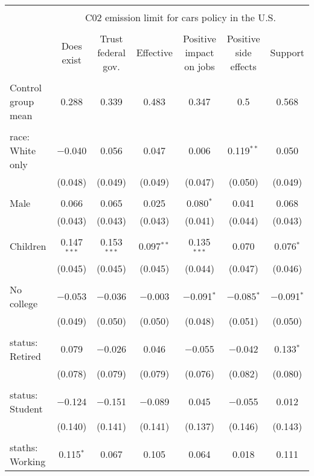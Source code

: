 
\begin{tabular}{@{\extracolsep{5pt}}lcccccc} 
\\[-1.8ex]\hline 
\hline \\[-1.8ex] 
 & \multicolumn{6}{c}{C02 emission limit for cars policy in the U.S.} \\ 
\cline{2-7} 
\\[-1.8ex] & Does exist & Trust federal gov. & Effective & Positive impact on jobs & Positive side effects & Support \\ 
\hline \\[-1.8ex] 
 Control group mean & 0.288 & 0.339 & 0.483 & 0.347 & 0.5 & 0.568  \\ \hline \\[-1.8ex] race: White only & $-$0.040 & 0.056 & 0.047 & 0.006 & 0.119$^{**}$ & 0.050 \\ 
  & (0.048) & (0.049) & (0.049) & (0.047) & (0.050) & (0.049) \\ 
  & & & & & & \\ 
 Male & 0.066 & 0.065 & 0.025 & 0.080$^{*}$ & 0.041 & 0.068 \\ 
  & (0.043) & (0.043) & (0.043) & (0.041) & (0.044) & (0.043) \\ 
  & & & & & & \\ 
 Children & 0.147$^{***}$ & 0.153$^{***}$ & 0.097$^{**}$ & 0.135$^{***}$ & 0.070 & 0.076$^{*}$ \\ 
  & (0.045) & (0.045) & (0.045) & (0.044) & (0.047) & (0.046) \\ 
  & & & & & & \\ 
 No college & $-$0.053 & $-$0.036 & $-$0.003 & $-$0.091$^{*}$ & $-$0.085$^{*}$ & $-$0.091$^{*}$ \\ 
  & (0.049) & (0.050) & (0.050) & (0.048) & (0.051) & (0.050) \\ 
  & & & & & & \\ 
 status: Retired & 0.079 & $-$0.026 & 0.046 & $-$0.055 & $-$0.042 & 0.133$^{*}$ \\ 
  & (0.078) & (0.079) & (0.079) & (0.076) & (0.082) & (0.080) \\ 
  & & & & & & \\ 
 status: Student & $-$0.124 & $-$0.151 & $-$0.089 & 0.045 & $-$0.055 & 0.012 \\ 
  & (0.140) & (0.141) & (0.141) & (0.137) & (0.146) & (0.143) \\ 
  & & & & & & \\ 
 staths: Working & 0.115$^{*}$ & 0.067 & 0.105 & 0.064 & 0.018 & 0.111 \\ 

\end{tabular}
